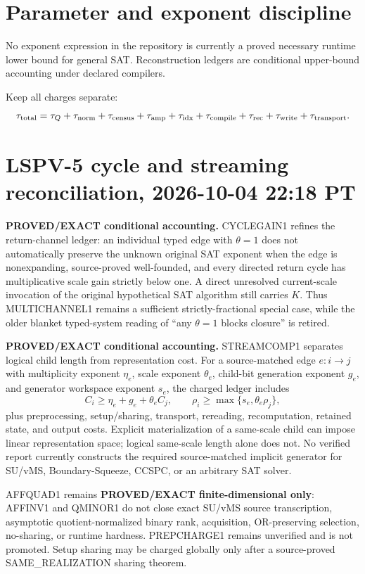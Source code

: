 \documentclass[11pt]{article}
\begin{document}
\section{Parameter and exponent discipline}

No exponent expression in the repository is currently a proved necessary runtime lower bound for
general SAT. Reconstruction ledgers are conditional upper-bound accounting under declared compilers.

Keep all charges separate:
\[
\tau_{\rm total}=
\tau_Q+\tau_{\rm norm}+\tau_{\rm census}+\tau_{\rm amp}
+\tau_{\rm idx}+\tau_{\rm compile}+\tau_{\rm rec}
+\tau_{\rm write}+\tau_{\rm transport}.
\]

\section{LSPV-5 cycle and streaming reconciliation, 2026-10-04 22:18 PT}

\textbf{PROVED/EXACT conditional accounting.} CYCLEGAIN1 refines the return-channel ledger: an individual typed edge with $\theta=1$ does not automatically preserve the unknown original SAT exponent when the edge is nonexpanding, source-proved well-founded, and every directed return cycle has multiplicative scale gain strictly below one. A direct unresolved current-scale invocation of the original hypothetical SAT algorithm still carries $K$. Thus MULTICHANNEL1 remains a sufficient strictly-fractional special case, while the older blanket typed-system reading of ``any $\theta=1$ blocks closure'' is retired.

\textbf{PROVED/EXACT conditional accounting.} STREAMCOMP1 separates logical child length from representation cost. For a source-matched edge $e:i\to j$ with multiplicity exponent $\eta_e$, scale exponent $\theta_e$, child-bit generation exponent $g_e$, and generator workspace exponent $s_e$, the charged ledger includes
\[
C_i\ge \eta_e+g_e+\theta_e C_j,
\qquad
\rho_i\ge\max\{s_e,\theta_e\rho_j\},
\]
plus preprocessing, setup/sharing, transport, rereading, recomputation, retained state, and output costs. Explicit materialization of a same-scale child can impose linear representation space; logical same-scale length alone does not. No verified report currently constructs the required source-matched implicit generator for SU/vMS, Boundary-Squeeze, CCSPC, or an arbitrary SAT solver.

AFFQUAD1 remains \textbf{PROVED/EXACT finite-dimensional only}: AFFINV1 and QMINOR1 do not close exact SU/vMS source transcription, asymptotic quotient-normalized binary rank, acquisition, OR-preserving selection, no-sharing, or runtime hardness. PREPCHARGE1 remains unverified and is not promoted. Setup sharing may be charged globally only after a source-proved SAME\_REALIZATION sharing theorem.
\end{document}
